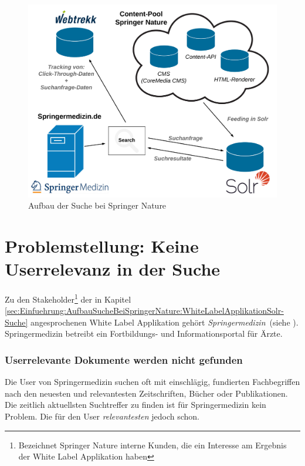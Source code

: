 \begin{figure}[H]
\centering
\vspace{-1.25em}
\caption[Aufbau der Suche bei Springer Nature]{Aufbau der Suche bei Springer Nature}
\vspace{.5em}
\label{fig:SucheSpringerNature}
\includegraphics[width=0.7\linewidth]{gfx/AufbauSucheSpringerNature}
\vspace{-2em}
\end{figure}


\section{Problemstellung: Keine Userrelevanz in der Suche}
\label{sec:Einfuehrung:Problemstellung}

Zu den Stakeholder\footnote{Bezeichnet Springer Nature interne Kunden, die ein Interesse am Ergebnis der White Label Applikation haben} der in Kapitel \ref{sec:Einfuehrung:AufbauSucheBeiSpringerNature:WhiteLabelApplikationSolr-Suche} angesprochenen White Label Applikation gehört \textit{Springermedizin}~(siehe \cite{SMED}). Springermedizin betreibt ein Fortbildungs- und Informationsportal für Ärzte.

\subsubsection{Userrelevante Dokumente werden nicht gefunden}
\label{sec:Einfuehrung:Problemstellung:Userrelevanz}

Die User von Springermedizin suchen oft mit einschlägig, fundierten Fachbegriffen nach den neuesten und relevantesten Zeitschriften, Bücher oder Publikationen. Die zeitlich aktuellsten Suchtreffer zu finden ist für Springermedizin kein Problem. Die für den User \textit{relevantesten} jedoch schon.

